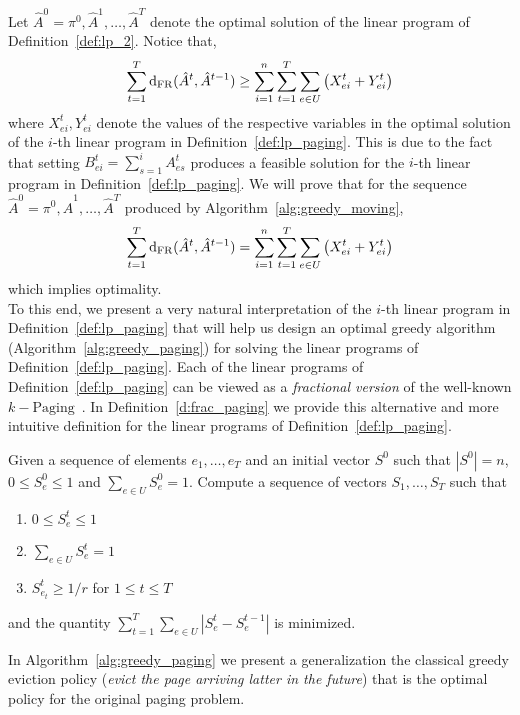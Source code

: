  \noindent Let $\hat{A}^0 = \pi^0,\hat{A}^1,\ldots, \hat{A}^T$ denote the optimal solution of the linear program of Definition~\ref{def:lp_2}. Notice that,
$$\sum_{t=1}^T \mathrm{d}_{\mathrm{FR}}(\hat{A}^t,\hat{A}^{t-1}) \geq  
\sum_{i=1}^n\sum_{t=1}^T\sum_{e \in U} \left(X_{ei}^t + Y_{ei}^t\right)
$$
where $X_{ei}^t,Y_{ei}^t$ denote the values of the respective variables in the optimal solution of the $i$-th linear program in Definition~\ref{def:lp_paging}. This is due to the fact that setting $B_{ei}^t = \sum_{s=1}^i A_{es}^t$ produces a feasible solution for the $i$-th linear program in Definition~\ref{def:lp_paging}. We will prove that for the sequence $\hat{A}^0 = \pi^0,\hat{A}^1,\ldots, \hat{A}^T$ produced by Algorithm~\ref{alg:greedy_moving},
$$\sum_{t=1}^T \mathrm{d}_{\mathrm{FR}}(\hat{A}^t,\hat{A}^{t-1}) =
\sum_{i=1}^n\sum_{t=1}^T\sum_{e \in U} \left(X_{ei}^t + Y_{ei}^t\right)
$$
which implies optimality.\\
\noindent To this end, we present a very natural interpretation of the $i$-th linear program in Definition~\ref{def:lp_paging} that will help us design an optimal greedy algorithm (Algorithm~\ref{alg:greedy_paging}) for solving the linear programs of Definition~\ref{def:lp_paging}.  Each of the linear programs of Definition~\ref{def:lp_paging} can be viewed as a \textit{fractional version} of the well-known $k-\mathrm{Paging}$~\cite{}. In Definition~\ref{d:frac_paging} we provide this alternative and more intuitive definition for the linear programs of Definition~\ref{def:lp_paging}. 
\begin{definition}\label{d:frac_paging}
Given a sequence of elements $e_1,\ldots,e_T$ and an initial vector $S^0$ such that $|S^0| = n$, $0 \leq S_e^0 \leq 1$ and
$\sum_{e \in U}S_e^0 = 1$. Compute a sequence of vectors $S_1,\ldots,S_T$ such that

\begin{enumerate}
    \item $0 \leq S_e^t \leq 1$
    
    \item $\sum_{e \in U} S_e^t = 1$
    
    \item $S_{e_t}^t \geq 1/r$ for $1\leq t \leq T$
\end{enumerate}
and the quantity $\sum_{t=1}^T \sum_{e \in U} | S_e^t - S_e^{t-1}|$ is minimized.
\end{definition}

\noindent In Algorithm~\ref{alg:greedy_paging} we present a generalization the classical greedy eviction policy (\textit{evict the page arriving latter in the future}) that is  the optimal policy for the original paging problem.

